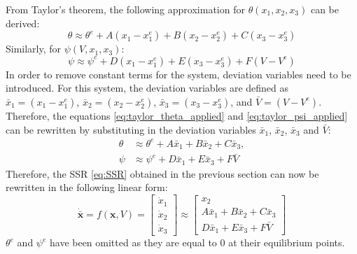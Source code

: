 \documentclass[a4paper,10pt,reqno]{amsart}
\numberwithin{equation}{section}
\begin{document}
From Taylor's theorem, the following approximation for $\theta(x_1, x_2, x_3)$ can be derived:
\begin{equation}
\label{eq:taylor_theta_applied}
    \theta \approx \theta^{e} + A(x_1-x_1^e) + B(x_2-x_2^e) + C(x_3-x_3^e)
\end{equation}
Similarly, for $\psi(V, x_1, x_3)$:
\begin{equation}
\label{eq:taylor_psi_applied}
    \psi \approx \psi^{e} + D(x_1-x_1^e) + E(x_3-x_3^e) + F(V-V^e)
\end{equation}
In order to remove constant terms for the system, deviation variables need to be introduced. For this system, the deviation variables are defined as $\bar x_1=(x_1-x_1^e)$, $\bar x_2=(x_2-x_2^e)$, $\bar x_3=(x_3-x_3^e)$, and $\bar V=(V-V^e)$. Therefore, the equations \eqref{eq:taylor_theta_applied} and \eqref{eq:taylor_psi_applied} can be rewritten by substituting in the deviation variables  $\bar x_1$, $\bar x_2$, $\bar x_3$ and $\bar V$:
\begin{align}
\label{eq:taylor_dev}
    \theta &\approx \theta^e + A\bar x_1 + B\bar x_2 + C\bar x_3, \\
    \psi &\approx \psi^e + D\bar x_1 + E\bar x_3 + F\bar V
\end{align}
Therefore, the SSR \eqref{eq:SSR} obtained in the previous section can now be rewritten in the following linear form:
\begin{equation}
\label{eq:SSR_lin}
    \mathbf{\dot \bar{x}} = f(\mathbf x, V) = \begin{bmatrix} 
        \dot x_1 \\ 
        \dot x_2 \\ 
        \dot x_3 
    \end{bmatrix} \approx \begin{bmatrix}
        x_2 \\
        A\bar x_1 + B\bar x_2 + C\bar x_3 \\
        D\bar x_1 + E\bar x_3 + F\bar V
    \end{bmatrix}
\end{equation}
$\theta^e$ and $\psi^e$ have been omitted as they are equal to 0 at their equilibrium points.
\end{document}
